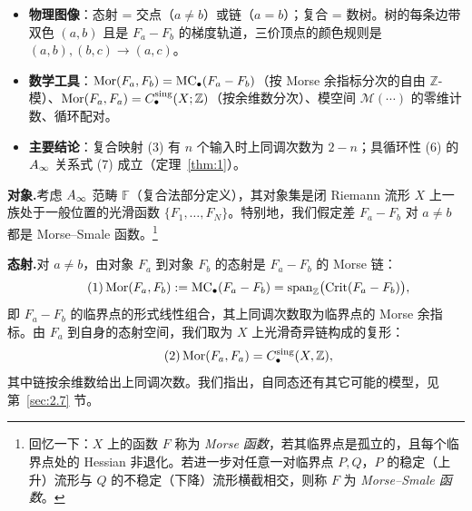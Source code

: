 \begin{takeaway}
\begin{itemize}
  \item \textbf{物理图像}：态射 = 交点（$a\neq b$）或链（$a=b$）；复合 = 数树。树的每条边带双色 $(a,b)$ 且是 $F_a-F_b$ 的梯度轨道，三价顶点的颜色规则是 $(a,b),(b,c)\to(a,c)$。
  \item \textbf{数学工具}：$\operatorname{Mor}(F_a,F_b)=\mathrm{MC}_\bullet(F_a-F_b)$（按 Morse 余指标分次的自由 $\mathbb Z$-模）、$\operatorname{Mor}(F_a,F_a)=C^{\mathrm{sing}}_\bullet(X;\mathbb Z)$（按余维数分次）、模空间 $\mathcal M(\cdots)$ 的零维计数、循环配对。
  \item \textbf{主要结论}：复合映射 (3) 有 $n$ 个输入时上同调次数为 $2-n$；具循环性 (6) 的 $A_\infty$ 关系式 (7) 成立（定理~\ref{thm:1}）。
\end{itemize}
\end{takeaway}

\textbf{对象.}\quad 考虑 $A_\infty$ 范畴 $\mathbb{F}$（复合法部分定义），其对象集是闭 Riemann 流形 $X$ 上一族处于一般位置的光滑函数 $\{F_1,\dots,F_N\}$。特别地，我们假定差 $F_a-F_b$ 对 $a\neq b$ 都是 Morse--Smale 函数。\footnote{回忆一下：$X$ 上的函数 $F$ 称为 \emph{Morse 函数}，若其临界点是孤立的，且每个临界点处的 Hessian 非退化。若进一步对任意一对临界点 $P,Q$，$P$ 的稳定（上升）流形与 $Q$ 的不稳定（下降）流形横截相交，则称 $F$ 为 \emph{Morse--Smale 函数}。}

\textbf{态射.}\quad 对 $a\neq b$，由对象 $F_a$ 到对象 $F_b$ 的态射是 $F_a-F_b$ 的 Morse 链：
\begin{equation}\tag{1}\label{eq:1}
  \operatorname{Mor}(F_a,F_b):=\mathrm{MC}_\bullet(F_a-F_b)=\operatorname{span}_{\mathbb Z}\bigl(\mathrm{Crit}(F_a-F_b)\bigr),
\end{equation}
即 $F_a-F_b$ 的临界点的形式线性组合，其上同调次数取为临界点的 Morse 余指标。由 $F_a$ 到自身的态射空间，我们取为 $X$ 上光滑奇异链构成的复形：
\begin{equation}\tag{2}\label{eq:2}
  \operatorname{Mor}(F_a,F_a)=C^{\mathrm{sing}}_\bullet(X,\mathbb Z),
\end{equation}
其中链按余维数给出上同调次数。我们指出，自同态还有其它可能的模型，见第~\ref{sec:2.7} 节。



